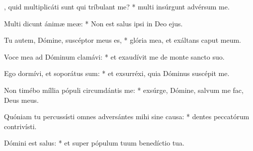 \begin{psalmus}

    , quid multiplicáti sunt qui tríbulant me? * multi insúrgunt advérsum me.

    Multi dicunt ánimæ meæ: * Non est salus ipsi in Deo ejus.

    Tu autem, Dómine, suscéptor meus es, * glória mea, et exáltans caput meum.

    Voce mea ad Dóminum clamávi: * et exaudívit me de monte sancto suo.

    Ego dormívi, et soporátus sum: * et exsurréxi, quia Dóminus suscépit me.

    Non timébo míllia pópuli circumdántis me: * exsúrge, Dómine, salvum me fac, Deus meus.

    Quóniam tu percussísti omnes adversántes mihi sine causa: * dentes peccatórum contrivísti.

    Dómini est salus: * et super pópulum tuum benedíctio tua.

\end{psalmus}
